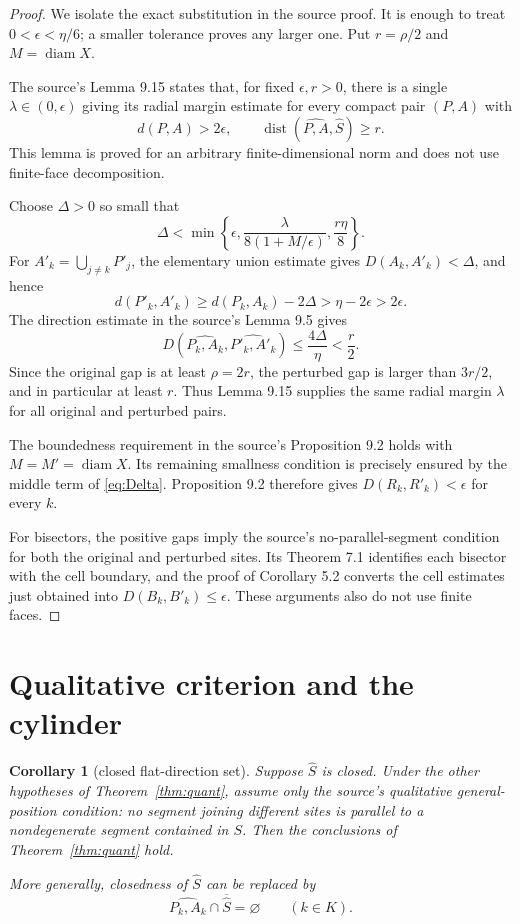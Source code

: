 \documentclass[11pt]{article}
\newtheorem{corollary}[theorem]{Corollary}
\newcommand{\dist}{\operatorname{dist}}
\begin{document}
\begin{proof}
We isolate the exact substitution in the source proof.  It is enough to treat
$0<\epsilon<\eta/6$; a smaller tolerance proves any larger one.  Put
$r=\rho/2$ and $M=\operatorname{diam}X$.

The source's Lemma 9.15 states that, for fixed $\epsilon,r>0$, there is a
single $\lambda\in(0,\epsilon)$ giving its radial margin estimate for every
compact pair $(P,A)$ with
\[
 d(P,A)>2\epsilon,
 \qquad \dist(\widehat{P,A},\widehat S)\geq r.
\]
This lemma is proved for an arbitrary finite-dimensional norm and does not use
finite-face decomposition.

Choose $\Delta>0$ so small that
\begin{equation}\label{eq:Delta}
 \Delta<\min\left\{\epsilon,
 \frac{\lambda}{8(1+M/\epsilon)},\frac{r\eta}{8}\right\}.
\end{equation}
For $A'_k=\bigcup_{j\neq k}P'_j$, the elementary union estimate gives
$D(A_k,A'_k)<\Delta$, and hence
\[
 d(P'_k,A'_k)\geq d(P_k,A_k)-2\Delta
 >\eta-2\epsilon>2\epsilon.
\]
The direction estimate in the source's Lemma 9.5 gives
\[
 D(\widehat{P_k,A_k},\widehat{P'_k,A'_k})
 \leq\frac{4\Delta}{\eta}<\frac r2.
\]
Since the original gap is at least $\rho=2r$, the perturbed gap is larger
than $3r/2$, and in particular at least $r$.  Thus Lemma 9.15 supplies the
same radial margin $\lambda$ for all original and perturbed pairs.

The boundedness requirement in the source's Proposition 9.2 holds with
$M=M'=\operatorname{diam}X$.  Its remaining smallness condition is precisely
ensured by the middle term of \eqref{eq:Delta}.  Proposition 9.2 therefore
gives $D(R_k,R'_k)<\epsilon$ for every $k$.

For bisectors, the positive gaps imply the source's no-parallel-segment
condition for both the original and perturbed sites.  Its Theorem 7.1
identifies each bisector with the cell boundary, and the proof of Corollary
5.2 converts the cell estimates just obtained into
$D(B_k,B'_k)\leq\epsilon$.  These arguments also do not use finite faces.
\end{proof}

\section{Qualitative criterion and the cylinder}

\begin{corollary}[closed flat-direction set]\label{cor:closed}
Suppose $\widehat S$ is closed.  Under the other hypotheses of
Theorem~\ref{thm:quant}, assume only the source's qualitative general-position
condition: no segment joining different sites is parallel to a nondegenerate
segment contained in $S$.  Then the conclusions of
Theorem~\ref{thm:quant} hold.

More generally, closedness of $\widehat S$ can be replaced by
\[
 \widehat{P_k,A_k}\cap\overline{\widehat S}=\varnothing
 \qquad(k\in K).
\]
\end{corollary}
\end{document}

